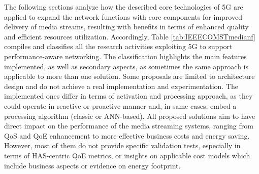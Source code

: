 The following sections analyze how the described core technologies of 5G %
are applied to expand the network functions with core components for improved delivery of media streams, resulting with benefits in terms of enhanced quality and efficient resources utilization. Accordingly, Table \ref{tab:IEEECOMSTmedianf} compiles and classifies all the research activities exploiting 5G to support performance-aware networking. The classification highlights the main features implemented, as well as secondary aspects, as sometimes the same approach is applicable to more than one solution.
Some proposals are limited to architecture design and do not achieve a real implementation and experimentation. The implemented ones differ in terms of activation and processing approach, as they could operate in reactive or proactive manner and, in same cases, embed a processing algorithm (classic or ANN-based).
All proposed solutions aim to have direct impact on the performance of the media streaming systems, ranging from QoS and QoE enhancement to more effective business costs and energy saving. However, most of them do not provide specific validation tests, especially in terms of HAS-centric QoE metrics, or insights on applicable cost models which include business aspects or evidence on energy footprint.

